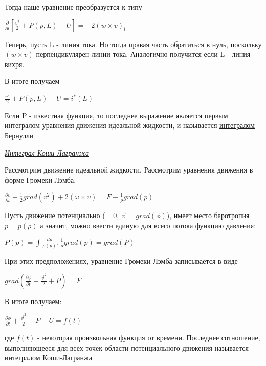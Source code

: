 Тогда наше уравнение преобразуется к типу
\begin{center}
	$\frac{\partial}{\partial l}[ \frac{v^2}{2} + P(p,L) - U] = -2(w\times v)_l$
\end{center}
Теперь, пусть L - линия тока. Но тогда правая часть обратиться в нуль, поскольку $(w\times v)$ перпендикулярен линии тока. Аналогично получится если L - линия вихря.


В итоге получаем 
\begin{center}
	$\frac{v^2}{2} + P(p,L) - U = i^*(L)$
\end{center}
Если P - известная функция, то последнее выражение является первым интегралом уравнения движения идеальной жидкости, и называется \underline{интегралом Бернулли}
\begin{center}
	\textit{\underline{Интеграл Коши-Лагранжа}}
\end{center}
Рассмотрим движение идеальной жидкости. Рассмотрим уравнения движения в форме Громеки-Лэмба.
\begin{center}
	$\frac{\partial v}{\partial t} + \frac{1}{2}grad(v^2) + 2(\omega\times v) = F - \frac{1}{\rho}grad(p)$
\end{center}
Пусть движение потенциально (\omega = 0, $\vec{v} = grad(\phi)$), имеет место баротропия $p = p(\rho)$ а значит, можно ввести единую для всего потока функцию давления:
\begin{center}
	$P(p) = \int \frac{dp}{\rho(p)}, \frac{1}{\rho}grad(p) = grad(P)$
\end{center}
При этих предположениях, уравнение Громеки-Лэмба записывается в виде
\begin{center}
	$grad(\frac{\partial\phi}{\partial t} + \frac{\vec{v}^2}{2} + P) = F$
\end{center}
В итоге получаем:
\begin{center}
	$\frac{\partial\phi}{\partial t} + \frac{\vec{v}^2}{2} + P - U = f(t)$
\end{center}
где $f(t)$ - некоторая произвольная функция от времени.
Последнее сотношение, выполняющееся для всех точек области потенциального движения называется \underline{интегрaлом Коши-Лагранжа}
